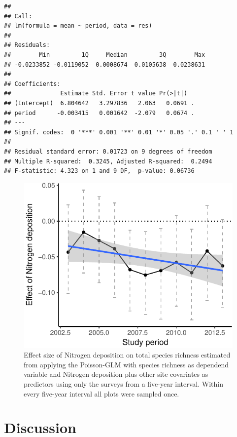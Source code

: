 \documentclass[fleqn,10pt,lineno]{wlpeerj} %
\theoremstyle{definition}
\theoremstyle{definition}
\theoremstyle{definition}
\theoremstyle{remark}
\begin{document}
\begin{verbatim}
## 
## Call:
## lm(formula = mean ~ period, data = res)
## 
## Residuals:
##        Min         1Q     Median         3Q        Max 
## -0.0233852 -0.0119052  0.0008674  0.0105638  0.0238631 
## 
## Coefficients:
##              Estimate Std. Error t value Pr(>|t|)  
## (Intercept)  6.804642   3.297836   2.063   0.0691 .
## period      -0.003415   0.001642  -2.079   0.0674 .
## ---
## Signif. codes:  0 '***' 0.001 '**' 0.01 '*' 0.05 '.' 0.1 ' ' 1
## 
## Residual standard error: 0.01723 on 9 degrees of freedom
## Multiple R-squared:  0.3245, Adjusted R-squared:  0.2494 
## F-statistic: 4.323 on 1 and 9 DF,  p-value: 0.06736
\end{verbatim}

\begin{figure}
\includegraphics[width=0.5\linewidth]{Manuscript_files/figure-latex/figconsequences-1} \caption{Effect size of Nitrogen deposition on total species richness estimated from applying the Poisson-GLM with species richness as dependend variable and Nitrogen deposition plus other site covariates as predictors using only the surveys from a five-year interval. Within every five-year interval all plots were sampled once.}\label{fig:figconsequences}
\end{figure}

\section*{Discussion}\label{discussion}
\end{document}
